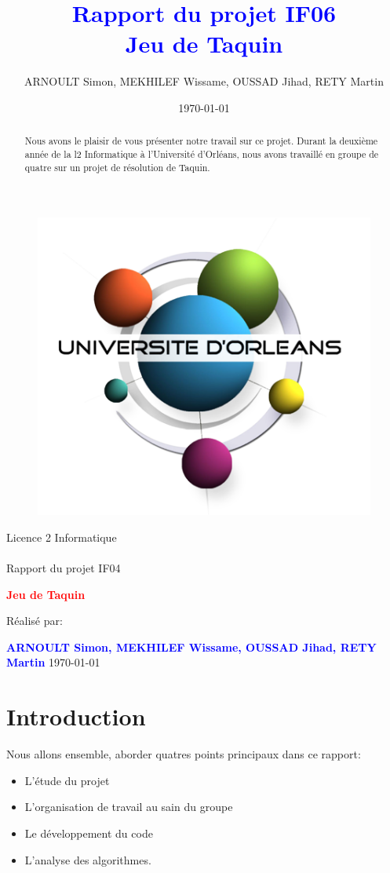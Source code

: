 ﻿\documentclass[a4paper,twoside,12pt]{report}
\title{\textcolor{blue}{\Large Rapport du projet IF06}\\\textcolor{blue}{\Large 
Jeu de Taquin}}
\author{ARNOULT Simon, MEKHILEF Wissame, OUSSAD Jihad, RETY Martin 
\date{\today}}
\begin{document}
\thispagestyle{empty}
%
\begin{figure}[H]
\includegraphics[width=0.2\linewidth]{Logo-univ-orleans.png}

\end{figure}
\vspace{2cm}
%
\begin{center}
{\Huge Licence 2 Informatique\\\ \\Rapport du projet IF04}
\par\vspace{1.4cm}

{\Huge\bf \textcolor{red}{\bf Jeu de Taquin}}
\par\vspace{1.6cm}

{\Large       Réalisé par:}
\par\vspace{1.3cm}
{\large\bf \textcolor{blue}{ARNOULT Simon, MEKHILEF Wissame, OUSSAD Jihad, RETY 
Martin}}
\vfill
\today
\end{center}
\pagestyle{fancy}

\begin{abstract}
%
Nous avons le plaisir de vous présenter notre travail sur ce projet. Durant la 
deuxième année de la l2 Informatique
à l'Université d'Orléans, nous avons travaillé en groupe de quatre sur un projet 
de résolution de Taquin.
\end{abstract}
 
\newpage
\tableofcontents
\listoffigures
\newpage

\chapter{Introduction}
Nous allons ensemble, aborder quatres points principaux dans ce rapport:
\begin{itemize}
\item L'étude du projet
\item L'organisation de travail au sain du groupe
\item Le développement du code
\item L'analyse des algorithmes.
\end{itemize}
%
\end{document}
